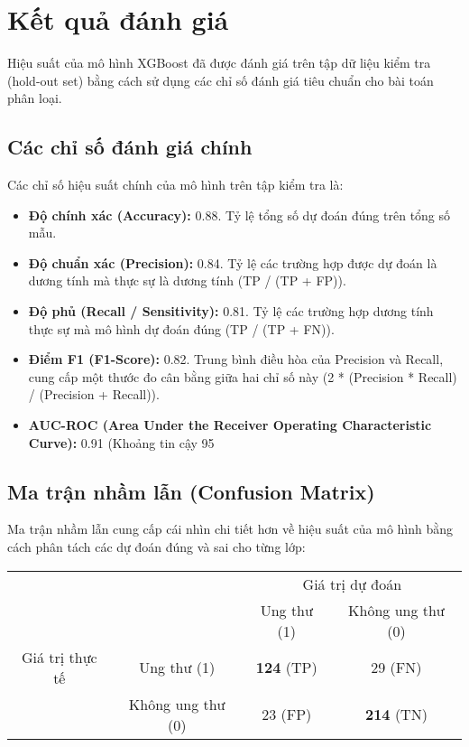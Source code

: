 \section{Kết quả đánh giá}

Hiệu suất của mô hình XGBoost đã được đánh giá trên tập dữ liệu kiểm tra (hold-out set) bằng cách sử dụng các chỉ số đánh giá tiêu chuẩn cho bài toán phân loại.

\subsection{Các chỉ số đánh giá chính}

Các chỉ số hiệu suất chính của mô hình trên tập kiểm tra là:
\begin{itemize}
    \item \textbf{Độ chính xác (Accuracy):} 0.88. Tỷ lệ tổng số dự đoán đúng trên tổng số mẫu.
    \item \textbf{Độ chuẩn xác (Precision):} 0.84. Tỷ lệ các trường hợp được dự đoán là dương tính mà thực sự là dương tính (TP / (TP + FP)).
    \item \textbf{Độ phủ (Recall / Sensitivity):} 0.81. Tỷ lệ các trường hợp dương tính thực sự mà mô hình dự đoán đúng (TP / (TP + FN)).
    \item \textbf{Điểm F1 (F1-Score):} 0.82. Trung bình điều hòa của Precision và Recall, cung cấp một thước đo cân bằng giữa hai chỉ số này (2 * (Precision * Recall) / (Precision + Recall)).
    \item \textbf{AUC-ROC (Area Under the Receiver Operating Characteristic Curve):} 0.91 (Khoảng tin cậy 95%
\end{itemize}

\subsection{Ma trận nhầm lẫn (Confusion Matrix)}

Ma trận nhầm lẫn cung cấp cái nhìn chi tiết hơn về hiệu suất của mô hình bằng cách phân tách các dự đoán đúng và sai cho từng lớp:

\begin{center}
\begin{tabular}{cc|c|c|}
  & \multicolumn{1}{c}{} & \multicolumn{2}{c}{Giá trị dự đoán} \\
  & \multicolumn{1}{c}{} & \multicolumn{1}{c}{Ung thư (1)}  & \multicolumn{1}{c}{Không ung thư (0)} \\
  \cline{3-4}
Giá trị thực tế & Ung thư (1) & \textbf{124} (TP) & 29 (FN) \\
  \cline{3-4}
  & Không ung thư (0) & 23 (FP) & \textbf{214} (TN) \\
  \cline{3-4}
\end{tabular}
\end{center}

